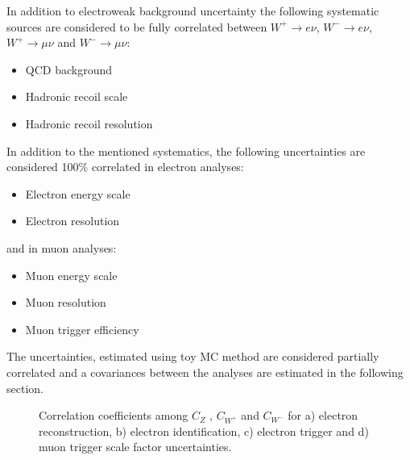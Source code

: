 In addition to electroweak background uncertainty the following systematic sources are considered to be fully correlated between $W^{+}\to e\nu$, $W^{-}\to e\nu$, $W^{+}\to \mu \nu$ and $W^{-}\to \mu \nu$:
\begin{itemize}
\item QCD background 
\item Hadronic recoil scale
\item Hadronic recoil resolution
\end{itemize}

In addition to the mentioned systematics, the following uncertainties are considered 100\% correlated in electron analyses:
\begin{itemize}
\item Electron energy scale
\item Electron resolution
\end{itemize}
and in muon analyses:
\begin{itemize}
\item Muon energy scale
\item Muon resolution
\item Muon trigger efficiency
\end{itemize}

The uncertainties, estimated using toy MC method are considered partially correlated and a covariances between the analyses are estimated in the following section.

\begin{figure}[!p]
\begin{minipage}[h]{0.49\linewidth}
\end{minipage}
\hfill
\begin{minipage}[h]{0.49\linewidth}
\end{minipage}
\vfill
\begin{minipage}[h]{0.49\linewidth}
\end{minipage}
\hfill
\begin{minipage}[h]{0.49\linewidth}
\end{minipage}
\caption{Correlation coefficients among $C_{Z}$ , $C_{W^{+}}$ and $C_{W^{-}}$   for a) electron reconstruction, b) electron identification, c) electron trigger and d) muon trigger scale factor uncertainties.}
\label{fig:CorToy}
\end{figure}

